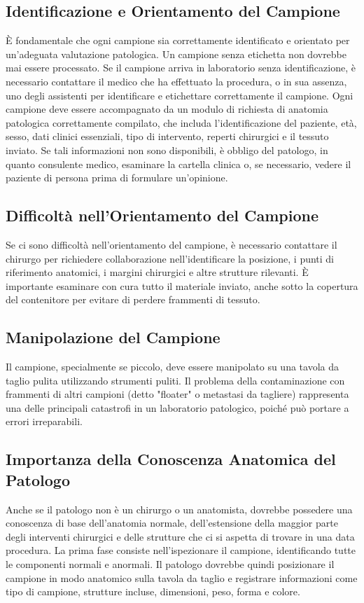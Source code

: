 \subsection{Identificazione e Orientamento del Campione}
È fondamentale che ogni campione sia correttamente identificato e orientato per un'adeguata valutazione patologica. Un campione senza etichetta non dovrebbe mai essere processato. Se il campione arriva in laboratorio senza identificazione, è necessario contattare il medico che ha effettuato la procedura, o in sua assenza, uno degli assistenti per identificare e etichettare correttamente il campione. Ogni campione deve essere accompagnato da un modulo di richiesta di anatomia patologica correttamente compilato, che includa l'identificazione del paziente, età, sesso, dati clinici essenziali, tipo di intervento, reperti chirurgici e il tessuto inviato. Se tali informazioni non sono disponibili, è obbligo del patologo, in quanto consulente medico, esaminare la cartella clinica o, se necessario, vedere il paziente di persona prima di formulare un'opinione.

\subsection{Difficoltà nell'Orientamento del Campione}
Se ci sono difficoltà nell'orientamento del campione, è necessario contattare il chirurgo per richiedere collaborazione nell'identificare la posizione, i punti di riferimento anatomici, i margini chirurgici e altre strutture rilevanti. È importante esaminare con cura tutto il materiale inviato, anche sotto la copertura del contenitore per evitare di perdere frammenti di tessuto.

\subsection{Manipolazione del Campione}
Il campione, specialmente se piccolo, deve essere manipolato su una tavola da taglio pulita utilizzando strumenti puliti. Il problema della contaminazione con frammenti di altri campioni (detto "floater" o metastasi da tagliere) rappresenta una delle principali catastrofi in un laboratorio patologico, poiché può portare a errori irreparabili.

\subsection{Importanza della Conoscenza Anatomica del Patologo}
Anche se il patologo non è un chirurgo o un anatomista, dovrebbe possedere una conoscenza di base dell'anatomia normale, dell'estensione della maggior parte degli interventi chirurgici e delle strutture che ci si aspetta di trovare in una data procedura. La prima fase consiste nell'ispezionare il campione, identificando tutte le componenti normali e anormali. Il patologo dovrebbe quindi posizionare il campione in modo anatomico sulla tavola da taglio e registrare informazioni come tipo di campione, strutture incluse, dimensioni, peso, forma e colore.

